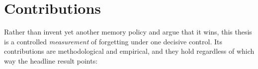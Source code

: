 

\section{Contributions}

Rather than invent yet another memory policy and argue that it wins, this thesis is a
controlled \emph{measurement} of forgetting under one decisive control. Its contributions
are methodological and empirical, and they hold regardless of which way the headline
result points:

